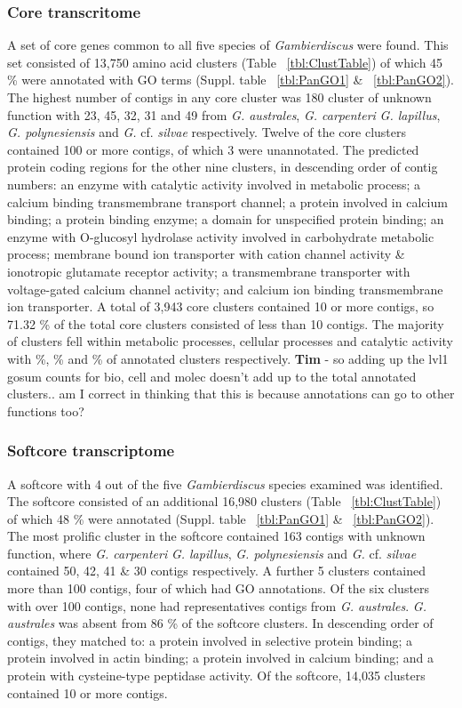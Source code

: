 \documentclass[12pt]{article}
\begin{document}
\subsubsection{Core transcritome}
A set of core genes common to all five species of \textit{Gambierdiscus} were found. 
This set consisted of 13,750 amino acid clusters (Table ~\ref{tbl:ClustTable}) of which 45 \% were annotated with GO terms (Suppl. table ~\ref{tbl:PanGO1} \& ~\ref{tbl:PanGO2}). 
The highest number of contigs in any core cluster was 180 cluster of unknown function with 23, 45, 32, 31 and 49 from \textit{G. australes}, \textit{G. carpenteri} \textit{G. lapillus}, \textit{G. polynesiensis} and \textit{G.} cf. \textit{silvae} respectively. 
Twelve of the core clusters contained 100 or more contigs, of which 3 were unannotated. 
The predicted protein coding regions for the other nine clusters, in descending order of contig numbers: an enzyme with catalytic activity involved in metabolic process; a calcium binding transmembrane transport channel; a protein involved in calcium binding; a protein binding enzyme; a domain for unspecified protein binding; an enzyme with O-glucosyl hydrolase activity involved in carbohydrate metabolic process; membrane bound ion transporter with cation channel activity \& ionotropic glutamate receptor activity; a transmembrane transporter with voltage-gated calcium channel activity; and calcium ion binding transmembrane ion transporter. 
A total of 3,943 core clusters contained 10 or more contigs, so 71.32 \% of the total core clusters consisted of less than 10 contigs. 
The majority of  clusters fell within metabolic processes, cellular processes and catalytic activity with \%, \% and \% of annotated clusters respectively. \textbf{Tim} - so adding up the lvl1 gosum counts for bio, cell and molec doesn't add up to the total annotated clusters.. am I correct in thinking that this is because annotations can go to other functions too?

\subsubsection{Softcore transcriptome}
A softcore with 4 out of the five \textit{Gambierdiscus} species examined was identified. 
The softcore consisted of an additional 16,980 clusters (Table ~\ref{tbl:ClustTable}) of which 48 \% were annotated  (Suppl. table ~\ref{tbl:PanGO1} \& ~\ref{tbl:PanGO2}). 
The most prolific cluster in the softcore contained 163 contigs with unknown function, where \textit{G. carpenteri} \textit{G. lapillus}, \textit{G. polynesiensis} and \textit{G.} cf. \textit{silvae} contained 50, 42, 41 \& 30 contigs respectively. 
A further 5 clusters contained more than 100 contigs, four of which had GO annotations. 
Of the six clusters with over 100 contigs, none had representatives contigs from \textit{G. australes}. 
\textit{G. australes} was absent from 86 \% of the softcore clusters. 
In descending order of contigs, they matched to: a protein involved in selective protein binding; a protein involved in actin binding; a protein involved in calcium binding; and a protein with cysteine-type peptidase activity. 
Of the softcore, 14,035 clusters contained 10 or more contigs. 
\end{document}
